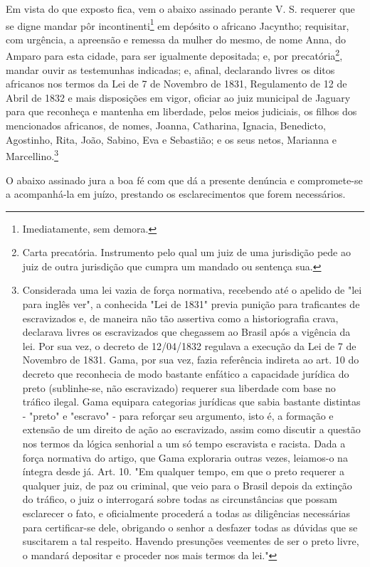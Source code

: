 Em vista do que exposto fica, vem o abaixo assinado perante V. S.
requerer que se digne mandar pôr incontinenti\footnote{Imediatamente,
  sem demora.} em depósito o africano Jacyntho; requisitar, com
urgência, a apreensão e remessa da mulher do mesmo, de nome Anna, do
Amparo para esta cidade, para ser igualmente depositada; e, por
precatória\footnote{Carta precatória. Instrumento pelo qual um juiz de
  uma jurisdição pede ao juiz de outra jurisdição que cumpra um mandado
  ou sentença sua.}, mandar ouvir as testemunhas indicadas; e, afinal,
declarando livres os ditos africanos nos termos da Lei de 7 de Novembro
de 1831, Regulamento de 12 de Abril de 1832 e mais disposições em vigor,
oficiar ao juiz municipal de Jaguary para que reconheça e mantenha em
liberdade, pelos meios judiciais, os filhos dos mencionados africanos,
de nomes, Joanna, Catharina, Ignacia, Benedicto, Agostinho, Rita, João,
Sabino, Eva e Sebastião; e os seus netos, Marianna e
Marcellino.\footnote{Considerada uma lei vazia de força normativa,
  recebendo até o apelido de "lei para inglês ver", a conhecida "Lei de
  1831" previa punição para traficantes de escravizados e, de maneira
  não tão assertiva como a historiografia crava, declarava livres os
  escravizados que chegassem ao Brasil após a vigência da lei. Por sua
  vez, o decreto de 12/04/1832 regulava a execução da Lei de 7 de
  Novembro de 1831. Gama, por sua vez, fazia referência indireta ao art.
  10 do decreto que reconhecia de modo bastante enfático a capacidade
  jurídica do preto (sublinhe-se, não escravizado) requerer sua
  liberdade com base no tráfico ilegal. Gama equipara categorias
  jurídicas que sabia bastante distintas - "preto" e "escravo" - para
  reforçar seu argumento, isto é, a formação e extensão de um direito de
  ação ao escravizado, assim como discutir a questão nos termos da
  lógica senhorial a um só tempo escravista e racista. Dada a força
  normativa do artigo, que Gama exploraria outras vezes, leiamos-o na
  íntegra desde já. Art. 10. "Em qualquer tempo, em que o preto requerer
  a qualquer juiz, de paz ou criminal, que veio para o Brasil depois da
  extinção do tráfico, o juiz o interrogará sobre todas as
  circunstâncias que possam esclarecer o fato, e oficialmente procederá
  a todas as diligências necessárias para certificar-se dele, obrigando
  o senhor a desfazer todas as dúvidas que se suscitarem a tal respeito.
  Havendo presunções veementes de ser o preto livre, o mandará depositar
  e proceder nos mais termos da lei."}

O abaixo assinado jura a boa fé com que dá a presente denúncia e
compromete-se a acompanhá-la em juízo, prestando os esclarecimentos que
forem necessários.

